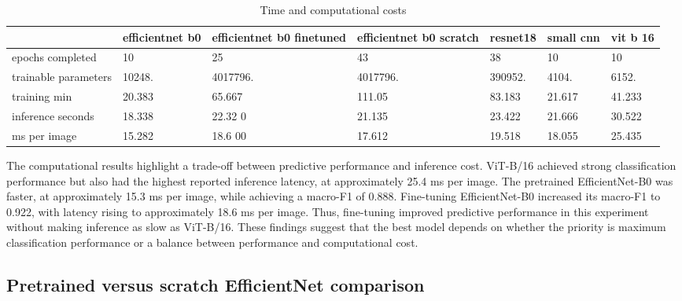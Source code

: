 \documentclass[conference]{IEEEtran}
\begin{document}
\begin{table}[ht]
\caption{Time and computational costs}
\begin{center}
\begin{tabular}{|m{3.5em}|m{3.8em}|m{3.8em}|m{3em}|m{3em}|m{2em}|m{2em}|}
\hline
 & efficientnet b0 & efficientnet b0 finetuned & efficientnet b0 scratch & resnet18 & small cnn & vit b 16\\
\hline
epochs completed & 10   & 25   & 43   & 38   & 10   & 10   \\
trainable parameters & 10248.   & 4017796.   & 4017796.   & 390952.   & 4104.   & 6152.   \\
training min  & 20.383 & 65.667 & 111.05 & 83.183 & 21.617 & 41.233 \\
inference seconds & 18.338  & 22.32 0 & 21.135  & 23.422  & 21.666  & 30.522  \\
ms per image & 15.282  & 18.6 00 & 17.612  & 19.518  & 18.055  & 25.435  \\
\hline
\end{tabular}
\label{tables:tab8}
\end{center}
\end{table}

The computational results highlight a trade-off between predictive performance and inference cost. ViT-B/16 achieved strong classification performance but also had the highest reported inference latency, at approximately 25.4 ms per image. The pretrained EfficientNet-B0 was faster, at approximately 15.3 ms per image, while achieving a macro-F1 of 0.888. Fine-tuning EfficientNet-B0 increased its macro-F1 to 0.922, with latency rising to approximately 18.6 ms per image. Thus, fine-tuning improved predictive performance in this experiment without making inference as slow as ViT-B/16. These findings suggest that the best model depends on whether the priority is maximum classification performance or a balance between performance and computational cost.

\subsection{Pretrained versus scratch EfficientNet comparison}
\end{document}

